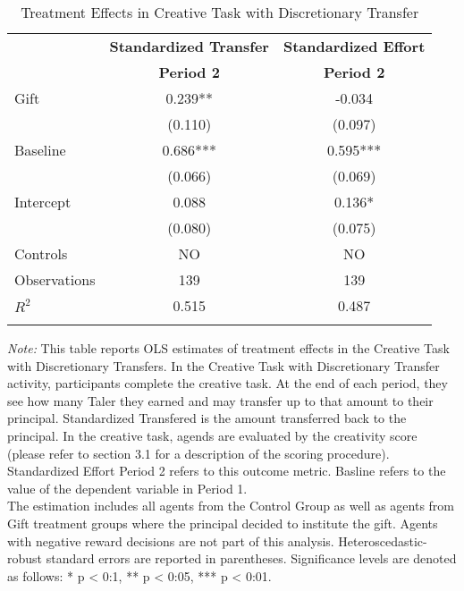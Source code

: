 \begin{table}[h]%
\setlength\tabcolsep{2pt}
\caption{Treatment Effects in Creative Task with Discretionary Transfer}
\begin{center}%
{\small\renewcommand{\arraystretch}{1}%
\begin{tabular}{lcc}
\hline\hline\noalign{\smallskip}
 & \bf Standardized Transfer & \bf Standardized Effort \\
 & \bf Period 2 & \bf Period 2 \\
\hline
Gift                &       0.239** &      -0.034   \\
                    &     (0.110)   &     (0.097)   \\
Baseline            &       0.686***&       0.595***\\
                    &     (0.066)   &     (0.069)   \\
Intercept           &       0.088   &       0.136*  \\
                    &     (0.080)   &     (0.075)   \\
\hline
\noalign{\smallskip}
Controls & NO & NO  \\
\hline
\noalign{\smallskip}
Observations        &         139   &         139   \\
$R^2$               &       0.515   &       0.487   \\
\hline\hline\noalign{\medskip}
\end{tabular}}
\begin{minipage}{\textwidth}
\footnotesize {\it Note:} This table reports OLS estimates of treatment effects in the Creative Task with Discretionary Transfers. 
In the Creative Task with Discretionary Transfer activity, participants complete the creative task. At the end of each period, they see how many Taler they earned and may transfer up to that amount to their principal. 
Standardized Transfered is the amount transferred back to the principal. 
In the creative task, agends are evaluated by the creativity score (please refer to section 3.1 for a description of the scoring procedure). 
Standardized Effort Period 2 refers to this outcome metric. 
Basline refers to the value of the dependent variable in Period 1. \\
The estimation includes all agents from the Control Group as well as agents from Gift treatment groups where the principal decided to institute the gift. Agents with negative reward decisions are not part of this analysis. 
Heteroscedastic-robust standard errors are reported in parentheses. Significance levels are denoted as follows: * p < 0:1, ** p < 0:05, *** p < 0:01. 
\end{minipage}
\end{center}
\end{table}
